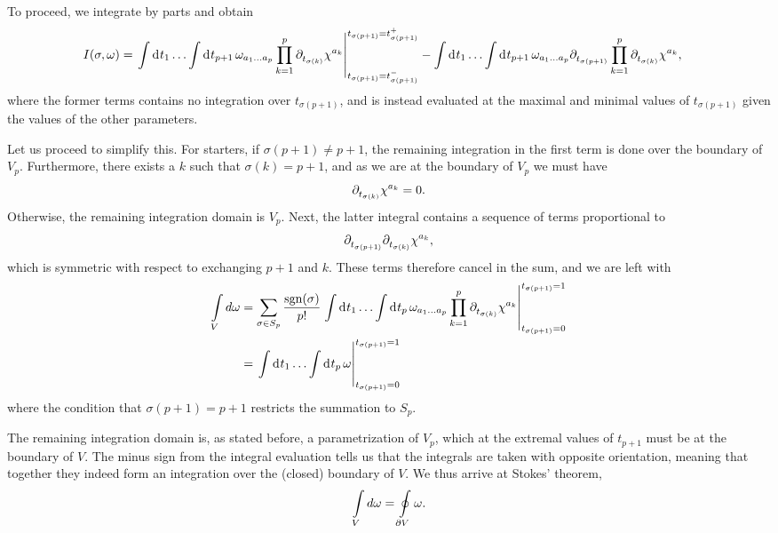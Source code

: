 To proceed, we integrate by parts and obtain
\begin{align*}
	I(\sigma, \omega) &= \eval{\integ{}{}{t_{1}}{\dots \integ{}{}{t_{p + 1}}{\omega_{a_{1}\dots a_{p}}\prod\limits_{k = 1}^{p}\del{t_{\sigma(k)}}{\chi^{a_{k}}}}}}_{t_{\sigma(p + 1)} = t_{\sigma(p + 1)}^{-}}^{t_{\sigma(p + 1)} = t_{\sigma(p + 1)}^{+}} - \integ{}{}{t_{1}}{\dots \integ{}{}{t_{p + 1}}{\omega_{a_{1}\dots a_{p}}\del{t_{\sigma(p + 1)}}{\prod\limits_{k = 1}^{p}\del{t_{\sigma(k)}}{\chi^{a_{k}}}}}},
\end{align*}
where the former terms contains no integration over $t_{\sigma(p + 1)}$, and is instead evaluated at the maximal and minimal values of $t_{\sigma(p + 1)}$ given the values of the other parameters.

Let us proceed to simplify this. For starters, if $\sigma(p + 1) \neq p + 1$, the remaining integration in the first term is done over the boundary of $V_{p}$. Furthermore, there exists a $k$ such that $\sigma(k) = p + 1$, and as we are at the boundary of $V_{p}$ we must have
\begin{align*}
	\partial^{}_{t_{\sigma(k)}}\chi^{a_{k}} = 0.
\end{align*}
Otherwise, the remaining integration domain is $V_{p}$. Next, the latter integral contains a sequence of terms proportional to
\begin{align*}
	\partial^{}_{t_{\sigma(p + 1)}}\partial^{}_{t_{\sigma(k)}}\chi^{a_{k}},
\end{align*}
which is symmetric with respect to exchanging $p + 1$ and $k$. These terms therefore cancel in the sum, and we are left with
\begin{align*}
	\minteg{V}{d\omega} &= \sum\limits_{\sigma\in S_{p}}\frac{\text{sgn}(\sigma)}{p!}\eval{\integ{}{}{t_{1}}{\dots \integ{}{}{t_{p}}{\omega_{a_{1}\dots a_{p}}\prod\limits_{k = 1}^{p}\del{t_{\sigma(k)}}{\chi^{a_{k}}}}}}_{t_{\sigma(p + 1)} = 0}^{t_{\sigma(p + 1)} = 1} \\
	                    &= \eval{\integ{}{}{t_{1}}{\dots \integ{}{}{t_{p}}{\omega}}}_{t_{\sigma(p + 1)} = 0}^{t_{\sigma(p + 1)} = 1}
\end{align*}
where the condition that $\sigma(p + 1) = p + 1$ restricts the summation to $S_{p}$.

The remaining integration domain is, as stated before, a parametrization of $V_{p}$, which at the extremal values of $t_{p + 1}$ must be at the boundary of $V$. The minus sign from the integral evaluation tells us that the integrals are taken with opposite orientation, meaning that together they indeed form an integration over the (closed) boundary of $V$. We thus arrive at Stokes' theorem,
\begin{align*}
	\int\limits_{V}d\omega = \oint\limits_{\partial V}\omega.
\end{align*}

